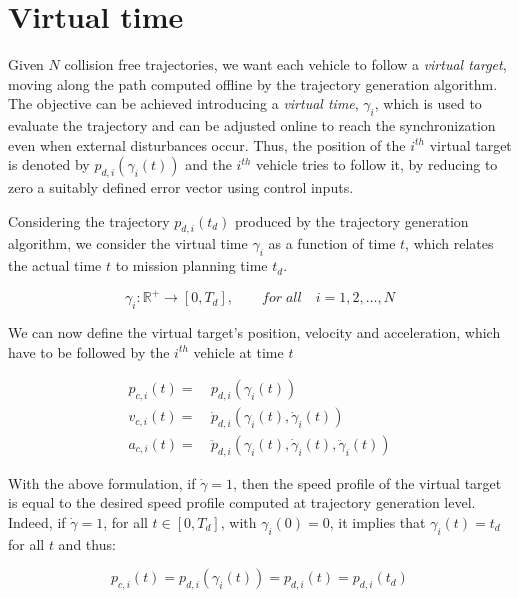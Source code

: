 \section{Virtual time\label{sec:virtual_time}}

Given $ N $ collision free trajectories, we want each vehicle to follow a \textit{virtual target},
moving along the path computed offline by the trajectory generation algorithm.
The objective can be achieved introducing a \textit{virtual time}, $ \gamma_i $,
which is used to evaluate the trajectory and can be adjusted online to reach
the synchronization even when external disturbances occur.
Thus, the position of the $ i^{th} $ virtual target is denoted by $ p_{d,i} ( \gamma_i (t))$
and the $ i^{th} $ vehicle tries to follow it, by reducing to zero a suitably defined
error vector using control inputs.

Considering the trajectory $ p_{d,i} (t_d) $ produced by the trajectory generation
algorithm, we consider the virtual time $ \gamma_i $ as a function of time $ t $,
which relates the actual time $t$ to mission planning time $t_d$.

\begin{equation}  \label{eq:virt_time_func}
  \gamma_i : \mathbb{R}^+ \rightarrow [0, T_d], \qquad for \; all \quad i = 1,2,\dots,N
\end{equation}

We can now define the virtual target's position, velocity and acceleration, which
have to be followed by the $ i^{th}$ vehicle at time $t$

\begin{equation}  \label{eq:pos_vel_acc_def}
  \begin{aligned}
  p_{c,i}(t) = \ & p_{d,i}(\gamma_i(t)) \\
  v_{c,i}(t) = \ & \dot{p}_{d,i} (\gamma_i(t), \dot{\gamma}_i (t)) \\
  a_{c,i}(t) = \ & \ddot{p}_{d,i} (\gamma_i(t), \dot{\gamma}_i(t), \ddot{\gamma}_i(t))
  \end{aligned}
\end{equation}

With the above formulation, if $ \dot{\gamma} = 1$, then the speed profile of
the virtual target is equal to the desired speed profile computed at trajectory
generation level.
Indeed, if $ \dot{\gamma} = 1$, for all $t \in [0, T_d]$, with $\gamma_i(0) = 0$,
it implies that $\gamma_i(t) = t_d$ for all $t$ and thus:

\begin{equation*}
  p_{c,i}(t) = p_{d,i}(\gamma_i(t)) = p_{d,i}(t) = p_{d,i} (t_d)
\end{equation*}

